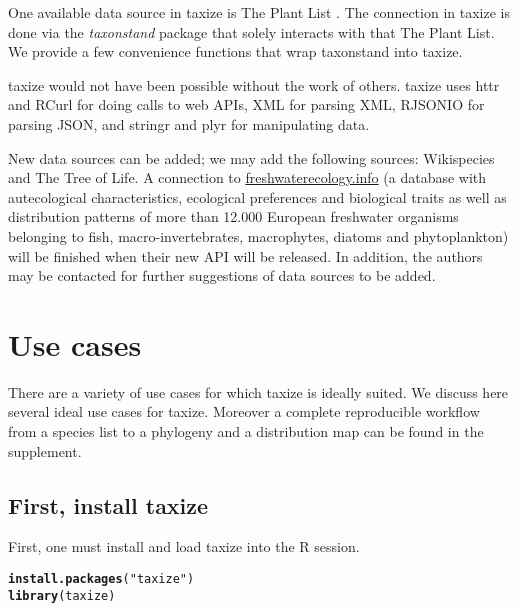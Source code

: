 \documentclass[10pt]{article}\usepackage[]{graphicx}\usepackage[]{color}
\makeatletter
\newcommand{\hlstr}[1]{\textcolor[rgb]{0.192,0.494,0.8}{#1}}%
\newcommand{\hlkwd}[1]{\textcolor[rgb]{0.737,0.353,0.396}{\textbf{#1}}}%
\newenvironment{kframe}{%
 \def\at@end@of@kframe{}%
 \ifinner\ifhmode%
  \def\at@end@of@kframe{\end{minipage}}%
  \begin{minipage}{\columnwidth}%
 \fi\fi%
 \def\FrameCommand##1{\hskip\@totalleftmargin \hskip-\fboxsep
 \colorbox{shadecolor}{##1}\hskip-\fboxsep
     \hskip-\linewidth \hskip-\@totalleftmargin \hskip\columnwidth}%
 \MakeFramed {\advance\hsize-\width
   \@totalleftmargin\z@ \linewidth\hsize
   \@setminipage}}%
 {\par\unskip\endMakeFramed%
 \at@end@of@kframe}
\newenvironment{knitrout}{}{} %
\makeatother
\begin{document}
One available data source in taxize is The Plant List \cite{theplantlist}. The connection in taxize is done via the \emph{taxonstand} package \cite{Cayuela_2012} that solely interacts with that The Plant List. We provide a few convenience functions that wrap taxonstand into taxize.

taxize would not have been possible without the work of others. taxize uses httr \cite{httr} and RCurl \cite{rcurl} for doing calls to web APIs, XML \cite{xml} for parsing XML, RJSONIO \cite{rjsonio} for parsing JSON, and stringr \cite{stringr} and plyr \cite{plyr} for manipulating data.

New data sources can be added; we may add the following sources: Wikispecies and The Tree of Life. A connection to \url{freshwaterecology.info} \cite{freshwaterecology} (a database with autecological characteristics, ecological preferences and biological traits as well as distribution patterns of more than 12.000 European freshwater organisms belonging to fish, macro-invertebrates, macrophytes, diatoms and phytoplankton) will be finished when their new API will be released.
In addition, the authors may be contacted for further suggestions of data sources to be added.

\section*{Use cases}

There are a variety of use cases for which taxize is ideally suited. We discuss here several ideal use cases for taxize. Moreover a complete reproducible workflow from a species list to a phylogeny and a distribution map can be found in the supplement.

\subsection*{First, install taxize}

First, one must install and load taxize into the R session.

\begin{knitrout}
\color{fgcolor}\begin{kframe}
\begin{alltt}
\hlkwd{install.packages}(\hlstr{"taxize"})
\hlkwd{library}(taxize)
\end{alltt}
\end{kframe}
\end{knitrout}
\end{document}
